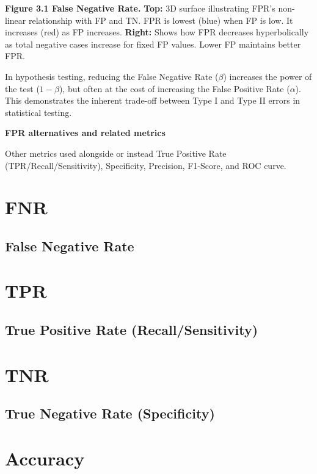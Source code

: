\textbf{Figure 3.1 False Negative Rate.} 
\textbf{Top:}
3D surface illustrating FPR's non-linear relationship with FP and TN. FPR is lowest (blue) when FP is low. It increases (red) as FP increases.
\textbf{Right:}
Shows how FPR decreases hyperbolically as total negative cases increase for fixed FP values. Lower FP maintains better FPR.


{
    In hypothesis testing, reducing the False Negative Rate ($\beta$) increases the power of the test ($1 - \beta$), but often at the cost of increasing the False Positive Rate ($\alpha$).
    This demonstrates the inherent trade-off between Type I and Type II errors in statistical testing.
}

\textbf{FPR alternatives and related metrics}

Other metrics used alongside or instead True Positive Rate (TPR/Recall/Sensitivity), Specificity, Precision, F1-Score, and ROC curve.

\clearpage
\thispagestyle{customstyle}
\section{FNR}
\subsection{False Negative Rate}

\clearpage
\thispagestyle{customstyle}
\section{TPR}
\subsection{True Positive Rate (Recall/Sensitivity)}

\clearpage
\thispagestyle{customstyle}
\section{TNR}
\subsection{True Negative Rate (Specificity)}

\clearpage
\thispagestyle{customstyle}
\section{Accuracy}
